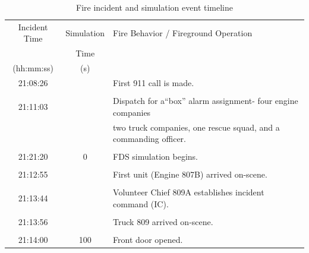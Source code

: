 \documentclass[12pt,oneside]{book}
\begin{document}
\begin{table}[!ht]
\caption[Fire incident and simulation event timeline]
{Fire incident and simulation event timeline}
\begin{tabular}{ccl}
\toprule
Incident Time  &  Simulation  &  Fire Behavior / Fireground Operation                                \\
               &  Time        &                                                                      \\
{(hh:mm:ss)}   &  {(s)}       &                                                                      \\
\midrule
21:08:26       &              &  First 911 call is made.                                             \\
               &              &                                                                      \\
21:11:03       &              &  Dispatch for a``box'' alarm assignment- four engine companies       \\
               &              &  two truck companies, one rescue squad, and a commanding officer.    \\
               &              &                                                                      \\
21:21:20       &  0           &  FDS simulation begins.                                              \\
               &              &                                                                      \\
21:12:55       &              &  First unit (Engine 807B) arrived on-scene.                          \\
               &              &                                                                      \\
21:13:44       &              &  Volunteer Chief 809A establishes incident command (IC).             \\
               &              &                                                                      \\
21:13:56       &              &  Truck 809 arrived on-scene.                                         \\
               &              &                                                                      \\
21:14:00       &  100         &  Front door opened.                                                  \\

\end{tabular}
\end{table}
\end{document}
